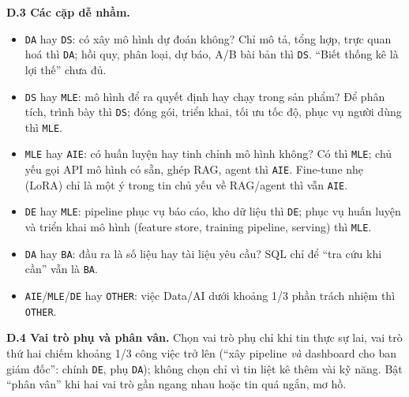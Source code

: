 \documentclass[12pt]{article}
\newcommand{\code}[1]{\texttt{#1}}
\begin{document}
\textbf{D.3 Các cặp dễ nhầm.}
\begin{itemize}[noitemsep, topsep=2pt, leftmargin=2.5em]
\item \code{DA} hay \code{DS}: có xây mô hình dự đoán không? Chỉ mô tả, tổng hợp, trực quan hoá thì \code{DA}; hồi quy, phân loại, dự báo, A/B bài bản thì \code{DS}. ``Biết thống kê là lợi thế'' chưa đủ.
\item \code{DS} hay \code{MLE}: mô hình để ra quyết định hay chạy trong sản phẩm? Để phân tích, trình bày thì \code{DS}; đóng gói, triển khai, tối ưu tốc độ, phục vụ người dùng thì \code{MLE}.
\item \code{MLE} hay \code{AIE}: có huấn luyện hay tinh chỉnh mô hình không? Có thì \code{MLE}; chủ yếu gọi API mô hình có sẵn, ghép RAG, agent thì \code{AIE}. Fine-tune nhẹ (LoRA) chỉ là một ý trong tin chủ yếu về RAG/agent thì vẫn \code{AIE}.
\item \code{DE} hay \code{MLE}: pipeline phục vụ báo cáo, kho dữ liệu thì \code{DE}; phục vụ huấn luyện và triển khai mô hình (feature store, training pipeline, serving) thì \code{MLE}.
\item \code{DA} hay \code{BA}: đầu ra là số liệu hay tài liệu yêu cầu? SQL chỉ để ``tra cứu khi cần'' vẫn là \code{BA}.
\item \code{AIE}/\code{MLE}/\code{DE} hay \code{OTHER}: việc Data/AI dưới khoảng 1/3 phần trách nhiệm thì \code{OTHER}.
\end{itemize}

\textbf{D.4 Vai trò phụ và phân vân.} Chọn vai trò phụ chỉ khi tin thực sự lai, vai trò thứ hai chiếm khoảng 1/3 công việc trở lên (``xây pipeline \textit{và} dashboard cho ban giám đốc'': chính \code{DE}, phụ \code{DA}); không chọn chỉ vì tin liệt kê thêm vài kỹ năng. Bật ``phân vân'' khi hai vai trò gần ngang nhau hoặc tin quá ngắn, mơ hồ.
\end{document}
